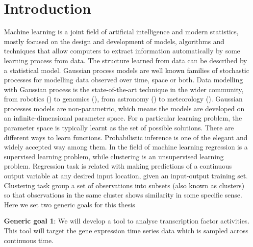 
\chapter{Introduction} \label{ch:Introduction} %

\ifpdf
    \graphicspath{{Chapter1/Figs/Raster/}{Chapter1/Figs/PDF/}{Chapter1/Figs/}}
\else
    \graphicspath{{Chapter1/Figs/Vector/}{Chapter1/Figs/}}
\fi

Machine learning is a joint field of artificial intelligence and modern statistics, mostly focused on the design and development of models, algorithms and techniques that allow computers to extract information automatically by some learning process from data. The structure learned from data can be described by a statistical model. Gaussian process models are well known families of stochastic processes for modelling data observed over time, space or both. Data modelling with Gaussian process is the state-of-the-art technique in the wider community, from robotics (\cite{Deisenroth:2014}) to genomics (\cite{Topa:2015}), from astronomy (\cite{Rajpaul:2015}) to  meteorology (\cite{Chen:2014}).  Gaussian processes models are non-parametric, which means the models are developed on an infinite-dimensional parameter space. For a particular learning problem, the parameter space is typically learnt as the set of possible solutions. There are different ways to learn functions. Probabilistic inference is one of the elegant and widely accepted way among them. In the field of machine learning regression is a supervised learning problem, while clustering is an unsupervised learning problem. Regression task is related with making predictions of a continuous output variable at any desired input location, given an input-output training set. Clustering task group a set of observations into subsets (also known as clusters) so that observations in the same cluster shows similarity in some specific sense. Here we set two generic goals for this thesis

\textbf{Generic goal 1}: We will develop a tool to analyse transcription factor activities. This tool will target the gene expression time series data which is sampled across continuous time. %

